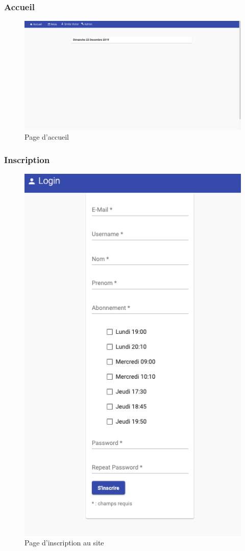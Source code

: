     \vspace{\baselineskip}
	\subsubsection{Accueil}
		\begin{figure}[!htbp]
       	 	\includegraphics[width=0.8\linewidth, center]{Mockup/Accueil.png}
       	 	\caption{Page d'accueil}
       	\end{figure}
       	
       	
	\newpage
	\subsubsection{Inscription}
		\begin{figure}[!htbp]
       	 	\includegraphics[width=0.5\linewidth, center]{Mockup/Inscription.png}
       	 	\caption{Page d'inscription au site}
       	\end{figure}
    
